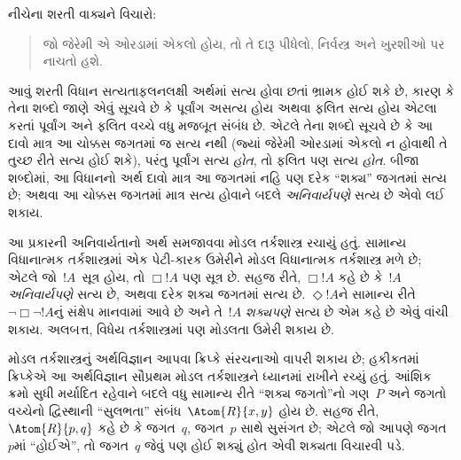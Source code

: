 \begingroup
\makeatletter{}\makeatother


\label{guunit:OLP-0180}


નીચેના શરતી વાક્યને વિચારો:
\begin{quote}
  જો જેરેમી એ ઓરડામાં એકલો હોય, તો તે દારૂ પીધેલો, નિર્વસ્ત્ર અને
  ખુરશીઓ પર નાચતો હશે.
\end{quote}
આવું શરતી વિધાન સત્યતાફલનલક્ષી અર્થમાં સત્ય હોવા છતાં ભ્રામક હોઈ શકે
છે, કારણ કે તેના શબ્દો જાણે એવું સૂચવે છે કે પૂર્વાંગ અસત્ય હોય અથવા
ફલિત સત્ય હોય એટલા કરતાં પૂર્વાંગ અને ફલિત વચ્ચે વધુ મજબૂત સંબંધ છે.
એટલે તેના શબ્દો સૂચવે છે કે આ દાવો માત્ર આ ચોક્કસ જગતમાં જ સત્ય નથી
(જ્યાં જેરેમી ઓરડામાં એકલો ન હોવાથી તે તુચ્છ રીતે સત્ય હોઈ શકે), પરંતુ
પૂર્વાંગ સત્ય \emph{હોત}, તો ફલિત પણ સત્ય \emph{હોત}. બીજા શબ્દોમાં,
આ વિધાનનો અર્થ દાવો માત્ર આ જગતમાં નહિ પણ દરેક ``શક્ય'' જગતમાં સત્ય
છે; અથવા આ ચોક્કસ જગતમાં માત્ર સત્ય હોવાને બદલે \emph{અનિવાર્યપણે}
સત્ય છે એવો લઈ શકાય.

આ પ્રકારની અનિવાર્યતાનો અર્થ સમજાવવા મોડલ તર્કશાસ્ત્ર રચાયું હતું.
સામાન્ય વિધાનાત્મક તર્કશાસ્ત્રમાં એક પેટી-કારક ઉમેરીને મોડલ
વિધાનાત્મક તર્કશાસ્ત્ર મળે છે; એટલે જો~$!A$~સૂત્ર હોય, તો
$\Box !A$ પણ સૂત્ર છે. સહજ રીતે, $\Box !A$ કહે છે કે~$!A$
\emph{અનિવાર્યપણે} સત્ય છે, અથવા દરેક શક્ય જગતમાં સત્ય છે.
$\Diamond !A$ને સામાન્ય રીતે $\lnot \Box \lnot !A$નું સંક્ષેપ માનવામાં
આવે છે અને તે~$!A$ \emph{શક્યપણે} સત્ય છે એમ કહે છે એવું વાંચી શકાય.
અલબત્ત, વિધેય તર્કશાસ્ત્રમાં પણ મોડલતા ઉમેરી શકાય છે.

મોડલ તર્કશાસ્ત્રનું અર્થવિજ્ઞાન આપવા ક્રિપ્કે સંરચનાઓ વાપરી
શકાય છે; હકીકતમાં ક્રિપ્કેએ આ અર્થવિજ્ઞાન સૌપ્રથમ મોડલ તર્કશાસ્ત્રને
ધ્યાનમાં રાખીને રચ્યું હતું. આંશિક ક્રમો સુધી મર્યાદિત રહેવાને બદલે
વધુ સામાન્ય રીતે ``શક્ય જગતો''નો ગણ~$P$ અને જગતો વચ્ચેનો દ્વિસ્થાની
``સુલભતા'' સંબંધ~$\Atom{R}{x,y}$ હોય છે. સહજ રીતે,
$\Atom{R}{p,q}$ કહે છે કે જગત~$q$, જગત~$p$ સાથે સુસંગત છે; એટલે જો
આપણે જગત~$p$માં ``હોઈએ'', તો જગત~$q$ જેવું પણ હોઈ શક્યું હોત એવી
શક્યતા વિચારવી પડે.

